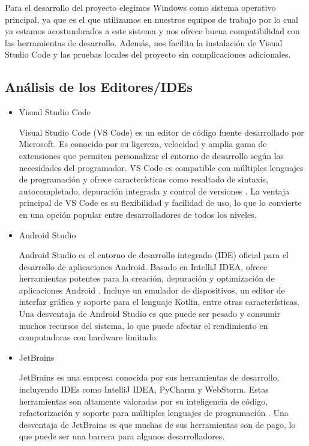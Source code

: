 Para el desarrollo del proyecto elegimos Windows como sistema operativo principal, ya que es el que utilizamos en nuestros equipos de trabajo por lo cual ya 
estamos acostumbrados a este sistema y nos ofrece buena compatibilidad con las herramientas de desarrollo. Además, nos facilita la instalación de Visual Studio Code y 
las pruebas locales del proyecto sin complicaciones adicionales.

\subsection{Análisis de los Editores/IDEs}

\begin{itemize}
    \item Visual Studio Code
    
    Visual Studio Code (VS Code) es un editor de código fuente desarrollado por Microsoft. Es conocido por su ligereza, velocidad y amplia gama de extensiones que
    permiten personalizar el entorno de desarrollo según las necesidades del programador. VS Code es compatible con múltiples lenguajes de programación y ofrece 
    características como resaltado de sintaxis, autocompletado, depuración integrada y control de versiones \cite{VSCode}. La ventaja principal de VS Code es su 
    flexibilidad y facilidad de uso, lo que lo convierte en una opción popular entre desarrolladores de todos los niveles.

    \item Android Studio

    Android Studio es el entorno de desarrollo integrado (IDE) oficial para el desarrollo de aplicaciones Android. Basado en IntelliJ IDEA, ofrece herramientas potentes
    para la creación, depuración y optimización de aplicaciones Android \cite{AndroidStudio}. Incluye un emulador de dispositivos, 
    un editor de interfaz gráfica y soporte para el lenguaje Kotlin, entre otras características. Una desventaja de Android Studio es que puede ser pesado y 
    consumir muchos recursos del sistema, lo que puede afectar el rendimiento en computadoras con hardware limitado.

    \item JetBrains

    JetBrains es una empresa conocida por sus herramientas de desarrollo, incluyendo IDEs como IntelliJ IDEA, PyCharm y WebStorm. 
    Estas herramientas son altamente valoradas por su inteligencia de código, refactorización y soporte para múltiples lenguajes de programación \cite{JetBrains}.
    Una desventaja de JetBrains es que muchas de sus herramientas son de pago, lo que puede ser una barrera para algunos desarrolladores.

\end{itemize}

